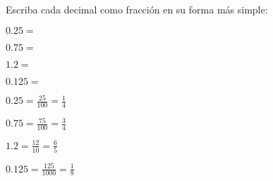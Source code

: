 \begin{exercise}
\problem Escriba cada decimal como fracción en su forma más simple:

\begin{exerciselist}
    \item $0.25 = $ \underline{\hspace{3cm}}
    \item $0.75 = $ \underline{\hspace{3cm}}
    \item $1.2 = $ \underline{\hspace{3cm}}
    \item $0.125 = $ \underline{\hspace{3cm}}
\end{exerciselist}

\begin{solucion}
\begin{exerciselist}
    \item $0.25 = \frac{25}{100} = \frac{1}{4}$
    \item $0.75 = \frac{75}{100} = \frac{3}{4}$
    \item $1.2 = \frac{12}{10} = \frac{6}{5}$
    \item $0.125 = \frac{125}{1000} = \frac{1}{8}$
\end{exerciselist}
\end{solucion}
\end{exercise}

